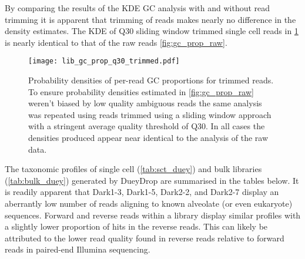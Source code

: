 By comparing the results of the KDE GC analysis with and without read trimming it
is apparent that trimming of reads makes nearly no difference in the density estimates.
The KDE of Q30 sliding window trimmed single cell reads in \cref{fig:gc_prop_q30} is nearly
identical to that of the raw reads \cref{fig:gc_prop_raw}.

\begin{figure}[h!]
    \texttt{[image: lib\_gc\_prop\_q30\_trimmed.pdf]}
    \caption[GC densities of bulk libraries]{Probability densities of per-read GC proportions for trimmed reads.
             To ensure probability densities estimated in \cref{fig:gc_prop_raw}
         weren't biased by low quality ambiguous reads the same analysis was
     repeated using reads trimmed using a sliding window approach with a stringent average
 quality threshold of Q30.  
 In all cases the densities produced appear near identical to
 the analysis of the raw data.}
    \label{fig:gc_prop_q30}
\end{figure}

The taxonomic profiles of single cell (\cref{tab:sct_duey}) and bulk libraries (\cref{tab:bulk_duey}) 
generated by DueyDrop are summarised in the tables below.  It is readily apparent 
that Dark1-3, Dark1-5, Dark2-2, and Dark2-7 display an aberrantly low number of reads
aligning to known alveolate (or even eukaryote) sequences. 
Forward and reverse reads within a library display similar profiles with a slightly
lower proportion of hits in the reverse reads. This can likely be attributed to
the lower read quality found in reverse reads relative to forward reads 
in paired-end Illumina sequencing. 


